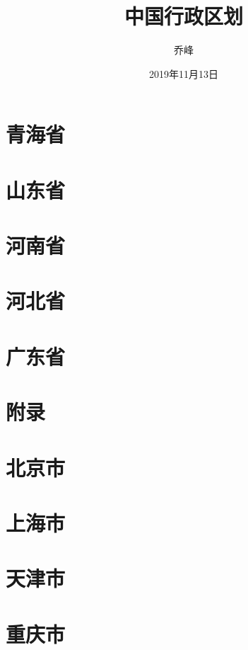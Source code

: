 \documentclass{article}
\title{中国行政区划}
\author{乔峰}
\date{2019年11月13日}
\begin{document}
	\maketitle
	
	\tableofcontents
	
	\section{青海省}
	
	\section{山东省}
	
	\section{河南省}
	
	\section{河北省}
	
	\section{广东省}
	\section*{附录}
	\appendix
	\section{北京市}
	
	\section{上海市}
	
	\section{天津市}
	
	\section{重庆市}
	
\end{document}
